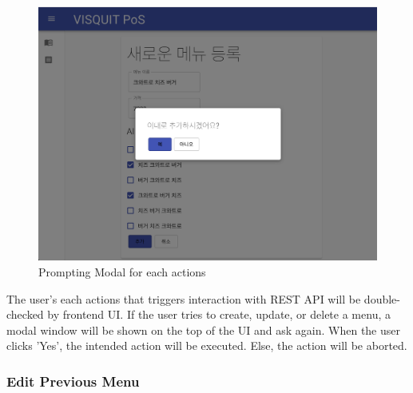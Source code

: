 \documentclass[conference,compsoc]{IEEEtran}
\begin{document}
\begin{figure}[h!]
  \includegraphics[width=\linewidth]{figures/frontend/05-newmenu-modal.png}
  \caption{Prompting Modal for each actions}
  \label{fig:05-newmenu-modal}
\end{figure}

The user's each actions that triggers interaction with REST API will be double-checked by frontend UI. If the user tries to create, update, or delete a menu, a modal window will be shown on the top of the UI and ask again. When the user clicks 'Yes', the intended action will be executed. Else, the action will be aborted.

\subsubsection{Edit Previous Menu}
\end{document}
